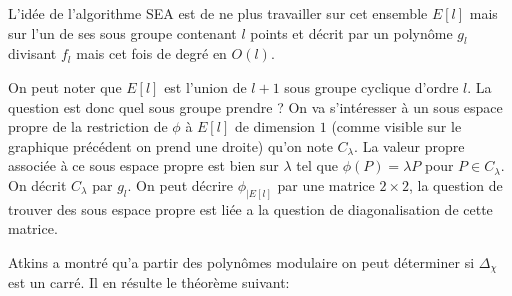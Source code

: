 \documentclass{article}
\begin{document}
L'idée de l'algorithme SEA est de ne plus travailler sur cet ensemble $E[l]$ mais sur l'un de ses sous groupe contenant $l$ points et décrit par un polynôme $g_l$ divisant $f_l$ mais cet fois de degré en $O(l)$.
\newline
\bigskip
{}

On peut noter que $E[l]$ est l'union de $l+1$ sous groupe cyclique d'ordre $l$.
La question est donc quel sous groupe prendre ? On va s’intéresser à un sous espace propre de la restriction de $\phi$ à $E[l]$ de dimension $1$ (comme visible sur le graphique précédent on prend une droite) qu'on note $C_{\lambda}$. La valeur propre associée à ce sous espace propre est bien sur $\lambda$ tel que $\phi(P) = \lambda P$ pour $P \in C_{\lambda}$. On décrit $C_{\lambda}$ par $g_l$.
\newline
On peut décrire $\phi_{|E[l]}$ par une matrice $2\times2$, la question de trouver des sous espace propre est liée a la question de diagonalisation de cette matrice.

Atkins a montré qu'a partir des polynômes modulaire on peut déterminer si $\Delta_{\chi}$ est un carré. Il en résulte le théorème suivant:
\end{document}
